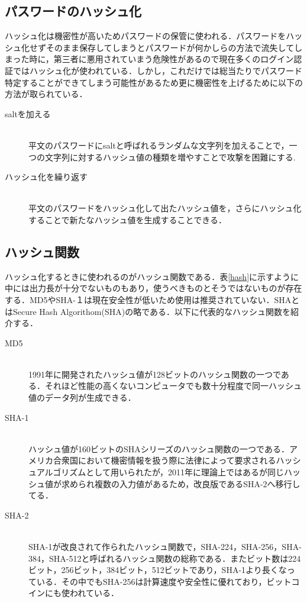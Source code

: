 \documentclass[a4j,11pt]{jsarticle}
\begin{document}
\subsection{パスワードのハッシュ化}
ハッシュ化は機密性が高いためパスワードの保管に使われる．パスワードをハッシュ化せずそのまま保存してしまうとパスワードが何かしらの方法で流失してしまった時に，第三者に悪用されていまう危険性があるので現在多くのログイン認証ではハッシュ化が使われている．しかし，これだけでは総当たりでパスワード特定することができてしまう可能性があるため更に機密性を上げるために以下の方法が取られている．
\begin{description}
   \item[saltを加える]\mbox{}\\ 平文のパスワードにsaltと呼ばれるランダムな文字列を加えることで，一つの文字列に対するハッシュ値の種類を増やすことで攻撃を困難にする. 
   
 \item[ハッシュ化を繰り返す]\mbox{}\\平文のパスワードをハッシュ化して出たハッシュ値を，さらにハッシュ化することで新たなハッシュ値を生成することできる．

\end{description}

\newpage

\subsection{ハッシュ関数}
ハッシュ化するときに使われるのがハッシュ関数である．表\ref{hash}に示すように中には出力長が十分でないものもあり，使うべきものとそうではないものが存在する．MD5やSHA-１は現在安全性が低いため使用は推奨されていない．SHAとはSecure Hash Algorithom(SHA)の略である．以下に代表的なハッシュ関数を紹介する．

\begin{description}
   \item[MD5]\mbox{}\\ 1991年に開発されたハッシュ値が128ビットのハッシュ関数の一つである．それほど性能の高くないコンピュータでも数十分程度で同一ハッシュ値のデータ列が生成できる．
   \item[SHA-1]\mbox{}\\ ハッシュ値が160ビットのSHAシリーズのハッシュ関数の一つである．アメリカ合衆国において機密情報を扱う際に法律によって要求されるハッシュアルゴリズムとして用いられたが，2011年に理論上ではあるが同じハッシュ値が求められ複数の入力値があるため，改良版であるSHA-2へ移行してる．
   \item[SHA-2]\mbox{}\\ SHA-1が改良されて作られたハッシュ関数で，SHA-224，SHA-256，SHA-384，SHA-512と呼ばれるハッシュ関数の総称である．またビット数は224ビット，256ビット，384ビット，512ビットであり，SHA-1より長くなっている．その中でもSHA-256は計算速度や安全性に優れており，ビットコインにも使われている．
\end{description}
\end{document}
